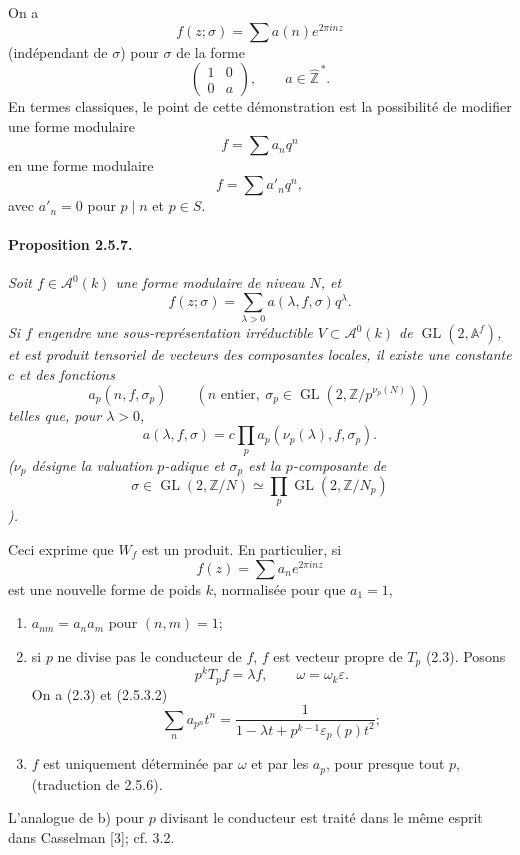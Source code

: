 \documentclass[10pt,a4paper]{article}
\providecommand{\GL}{\operatorname{GL}}
\providecommand{\Z}{\mathbb Z}
\providecommand{\Af}{\mathbb A^f}
\begin{document}
\clearpage
{}
\hypertarget{authority-37}{}
On a
\[
f(z;\sigma)=\sum a(n)e^{2\pi inz}
\]
(indépendant de \(\sigma\)) pour \(\sigma\) de la forme
\[
\begin{pmatrix}1&0\\0&a\end{pmatrix},\qquad a\in\widehat{\Z}^{\,*}.
\]
En termes classiques, le point de cette démonstration est la possibilité de modifier une forme modulaire
\[
f=\sum a_nq^n
\]
en une forme modulaire
\[
f=\sum a'_nq^n,
\]
avec \(a'_n=0\) pour \(p\mid n\) et \(p\in S\).

\paragraph{Proposition 2.5.7.}{\itshape  Soit \(f\in \mathcal A^0(k)\) une forme modulaire de niveau \(N\), et
\[
f(z;\sigma)=\sum_{\lambda>0}a(\lambda,f,\sigma)q^\lambda.
\]
Si \(f\) engendre une sous-représentation irréductible \(V\subset \mathcal A^0(k)\) de \(\GL(2,\Af)\), et est produit tensoriel de vecteurs des composantes locales, il existe une constante \(c\) et des fonctions
\[
a_p(n,f,\sigma_p)\qquad (n\text{ entier},\ \sigma_p\in\GL(2,\Z/p^{\nu_p(N)}))
\]
telles que, pour \(\lambda>0\),
\[
a(\lambda,f,\sigma)=c\prod_p a_p(\nu_p(\lambda),f,\sigma_p).
\]
(\(\nu_p\) désigne la valuation \(p\)-adique et \(\sigma_p\) est la \(p\)-composante de
\[
\sigma\in\GL(2,\Z/N)\simeq\prod_p\GL(2,\Z/N_p)
\]
).\par}

Ceci exprime que \(W_f\) est un produit. En particulier, si
\[
f(z)=\sum a_ne^{2\pi inz}
\]
est une nouvelle forme de poids \(k\), normalisée pour que \(a_1=1\),
\begin{enumerate}[label=\alph*)]
\item \(a_{nm}=a_na_m\) pour \((n,m)=1\);
\item si \(p\) ne divise pas le conducteur de \(f\), \(f\) est vecteur propre de \(T_p\) (2.3). Posons
\[
p^kT_pf=\lambda f,
\qquad \omega=\omega_k\varepsilon.
\]
On a (2.3) et (2.5.3.2)
\[
\sum_n a_{p^n}t^n=\frac{1}{1-\lambda t+p^{k-1}\varepsilon_p(p)t^2};
\]
\item \(f\) est uniquement déterminée par \(\omega\) et par les \(a_p\), pour presque tout \(p\), (traduction de 2.5.6).
\end{enumerate}

\clearpage
{}
\hypertarget{authority-38}{}
L'analogue de b) pour \(p\) divisant le conducteur est traité dans le même esprit dans Casselman [3]; cf. 3.2.
\end{document}
